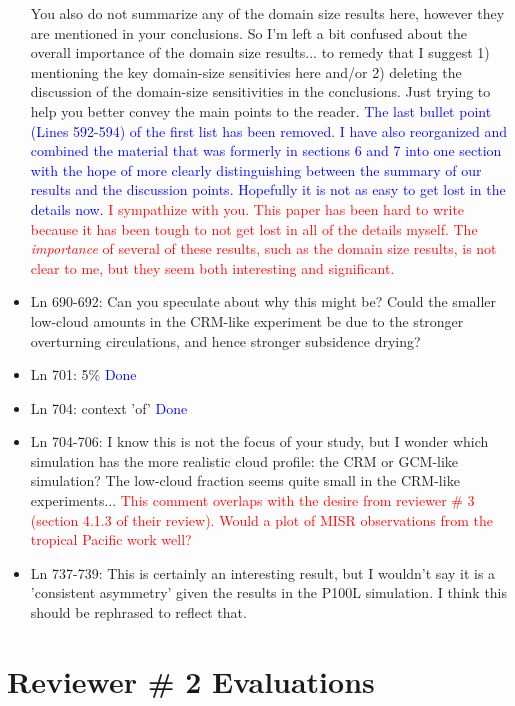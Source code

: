 \documentclass[draft]{agujournal2019}
\begin{document}
\begin{itemize}
You also do not summarize any of the domain size results here, however they are mentioned in your conclusions. So I'm left a bit confused about the overall importance of the domain size results... to remedy that I suggest 1) mentioning the key domain-size sensitivies here and/or 2)  deleting the discussion of the domain-size sensitivities in the conclusions. Just trying to help you better convey the main points to the reader.
  \textcolor{blue}{The last bullet point (Lines 592-594) of the first list has been removed.  I have also reorganized and combined the material that was 
  formerly in sections 6 and 7 into one section with the hope of more clearly distinguishing between the summary of our results and the discussion points.  Hopefully it is not as easy to get lost in the details now.}
  \textcolor{red}{I sympathize with you.  This paper has been hard to write because it has been tough to not get lost in all of the details myself.  The \textit{importance} of several of these results, such as the domain size results, is not clear to me, but they 
  seem both interesting and significant.}
  
  \item Ln 690-692: Can you speculate about why this might be? Could the smaller low-cloud amounts in the CRM-like experiment be due to the stronger overturning circulations, and hence stronger subsidence drying? 
  
  \item Ln 701: 5\%
  \textcolor{blue}{Done}
  
  \item Ln 704: context 'of' 
  \textcolor{blue}{Done}
  
  \item Ln 704-706: I know this is not the focus of your study, but I wonder which simulation has the more realistic cloud profile: the CRM or GCM-like simulation? The low-cloud fraction seems quite small in the CRM-like experiments...
  \textcolor{red}{This comment overlaps with the desire from reviewer \# 3 (section 4.1.3 of their review).  Would a plot of MISR observations from the tropical Pacific work well?  }
  
  \item Ln 737-739: This is certainly an interesting result, but I wouldn't say it is a 'consistent asymmetry' given the results in the P100L simulation. I think this should be rephrased to reflect that.
%
\end{itemize}

\section{Reviewer \# 2 Evaluations}
\end{document}
